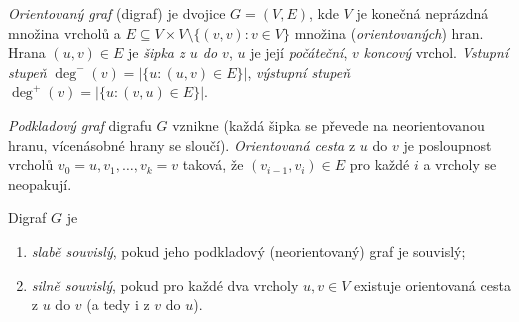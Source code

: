 \documentclass[11pt,a4paper]{article}
\begin{document}
\begin{definice}
\emph{Orientovaný graf} (digraf) je dvojice $G=(V,E)$, kde $V$ je konečná neprázdná množina vrcholů a $E\subseteq V\times V\setminus\{(v,v):v\in V\}$ množina (\emph{orientovaných}) hran. Hrana $(u,v)\in E$ je \emph{šipka z $u$ do $v$}, $u$ je její \emph{počáteční}, $v$ \emph{koncový} vrchol. \emph{Vstupní stupeň} $\deg^{-}(v)=|\{u:(u,v)\in E\}|$, \emph{výstupní stupeň} $\deg^{+}(v)=|\{u:(v,u)\in E\}|$.
\end{definice}

\begin{definice}
\emph{Podkladový graf} digrafu $G$ vznikne  (každá šipka se převede na neorientovanou hranu, vícenásobné hrany se sloučí). \emph{Orientovaná cesta} z $u$ do $v$ je posloupnost vrcholů $v_0=u,v_1,\dots,v_k=v$ taková, že $(v_{i-1},v_i)\in E$ pro každé $i$ a vrcholy se neopakují.
\end{definice}

\begin{definice}
Digraf $G$ je
\begin{enumerate}[label=(\arabic*)]
  \item \emph{slabě souvislý}, pokud jeho podkladový (neorientovaný) graf je souvislý;
  \item \emph{silně souvislý}, pokud pro každé dva vrcholy $u,v\in V$ existuje orientovaná cesta z $u$ do $v$ (a tedy i z $v$ do $u$).
\end{enumerate}
\end{definice}

\begin{center}
\end{center}
\end{document}
